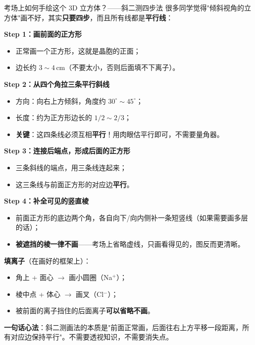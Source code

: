 \begin{insightbox}{考场上如何手绘这个 3D 立方体？——斜二测四步法}
很多同学觉得"倾斜视角的立方体"画不好，其实\textbf{只要四步}，而且所有线都是\textbf{平行线}：

\textbf{Step 1：画前面的正方形}
\begin{itemize}[nosep]
  \item 正常画一个正方形，这就是晶胞的正面；
  \item 边长约 $3\sim 4\,\text{cm}$（不要太小，否则后面填不下离子）。
\end{itemize}

\textbf{Step 2：从四个角拉三条平行斜线}
\begin{itemize}[nosep]
  \item 方向：向右上方倾斜，角度约 $30^\circ \sim 45^\circ$；
  \item 长度：约为正方形边长的 $1/2 \sim 2/3$；
  \item \textbf{关键}：这四条线必须互相\textbf{平行}！用肉眼估平行即可，不需要量角器。
\end{itemize}

\textbf{Step 3：连接后端点，形成后面的正方形}
\begin{itemize}[nosep]
  \item 三条斜线的端点，用三条线连起来；
  \item 这三条线与前面正方形的对应边\textbf{平行}。
\end{itemize}

\textbf{Step 4：补全可见的竖直棱}
\begin{itemize}[nosep]
  \item 前面正方形的底边两个角，各自向下/向内侧补一条短竖线（如果需要画多层的话）；
  \item \textbf{被遮挡的棱一律不画}——考场上省略虚线，只画看得见的，图反而更清晰。
\end{itemize}

\textbf{填离子}（在画好的框架上）：
\begin{itemize}[nosep]
  \item 角上 + 面心 $\rightarrow$ 画小圆圈（Na$^+$）；
  \item 棱中点 + 体心 $\rightarrow$ 画叉（Cl$^-$）；
  \item 被前面的离子挡住的后面离子\textbf{可以省略不画}。
\end{itemize}

\textbf{一句话心法}：斜二测画法的本质是"前面正常画，后面往右上方平移一段距离，所有对应边保持平行"。不需要透视知识，不需要消失点。
\end{insightbox}

